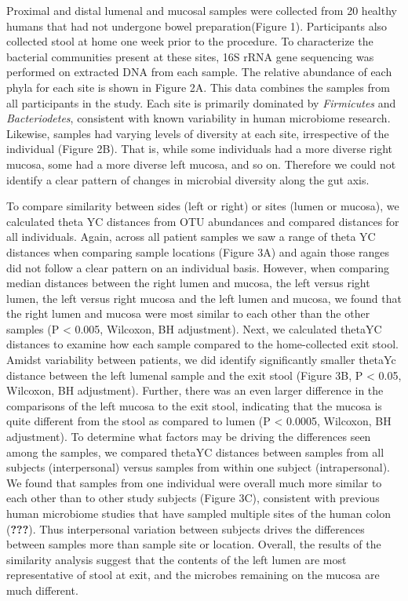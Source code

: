 \documentclass[11pt,]{article}
\begin{document}
Proximal and distal lumenal and mucosal samples were collected from 20
healthy humans that had not undergone bowel preparation(Figure 1).
Participants also collected stool at home one week prior to the
procedure. To characterize the bacterial communities present at these
sites, 16S rRNA gene sequencing was performed on extracted DNA from each
sample. The relative abundance of each phyla for each site is shown in
Figure 2A. This data combines the samples from all participants in the
study. Each site is primarily dominated by \emph{Firmicutes} and
\emph{Bacteriodetes}, consistent with known variability in human
microbiome research. Likewise, samples had varying levels of diversity
at each site, irrespective of the individual (Figure 2B). That is, while
some individuals had a more diverse right mucosa, some had a more
diverse left mucosa, and so on. Therefore we could not identify a clear
pattern of changes in microbial diversity along the gut axis.

To compare similarity between sides (left or right) or sites (lumen or
mucosa), we calculated theta YC distances from OTU abundances and
compared distances for all individuals. Again, across all patient
samples we saw a range of theta YC distances when comparing sample
locations (Figure 3A) and again those ranges did not follow a clear
pattern on an individual basis. However, when comparing median distances
between the right lumen and mucosa, the left versus right lumen, the
left versus right mucosa and the left lumen and mucosa, we found that
the right lumen and mucosa were most similar to each other than the
other samples (P \textless{} 0.005, Wilcoxon, BH adjustment). Next, we
calculated thetaYC distances to examine how each sample compared to the
home-collected exit stool. Amidst variability between patients, we did
identify significantly smaller thetaYc distance between the left lumenal
sample and the exit stool (Figure 3B, P \textless{} 0.05, Wilcoxon, BH
adjustment). Further, there was an even larger difference in the
comparisons of the left mucosa to the exit stool, indicating that the
mucosa is quite different from the stool as compared to lumen (P
\textless{} 0.0005, Wilcoxon, BH adjustment). To determine what factors
may be driving the differences seen among the samples, we compared
thetaYC distances between samples from all subjects (interpersonal)
versus samples from within one subject (intrapersonal). We found that
samples from one individual were overall much more similar to each other
than to other study subjects (Figure 3C), consistent with previous human
microbiome studies that have sampled multiple sites of the human colon
(\textbf{???}). Thus interpersonal variation between subjects drives the
differences between samples more than sample site or location. Overall,
the results of the similarity analysis suggest that the contents of the
left lumen are most representative of stool at exit, and the microbes
remaining on the mucosa are much different.
\end{document}
